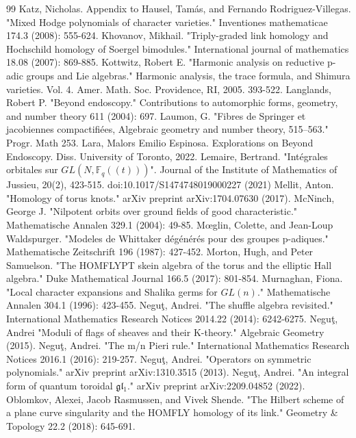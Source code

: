 \documentclass{amsart}
\numberwithin{equation}{section}
\theoremstyle{definition}
\newcommand{\fl}{\mathfrak{l}}
\newcommand{\fg}{\mathfrak{g}}
\begin{document}
\begin{thebibliography}{99}
 Katz, Nicholas. Appendix to Hausel, Tamás, and Fernando Rodriguez-Villegas. "Mixed Hodge polynomials of character varieties." Inventiones mathematicae 174.3 (2008): 555-624.
 Khovanov, Mikhail. "Triply-graded link homology and Hochschild homology of Soergel bimodules." International journal of mathematics 18.08 (2007): 869-885.
 Kottwitz, Robert E. "Harmonic analysis on reductive p-adic groups and Lie algebras." Harmonic analysis, the trace formula, and Shimura varieties. Vol. 4. Amer. Math. Soc. Providence, RI, 2005. 393-522.
 Langlands, Robert P. "Beyond endoscopy." Contributions to automorphic forms, geometry, and number theory 611 (2004): 697.
 Laumon, G. "Fibres de Springer et jacobiennes compactifiées, Algebraic geometry and number theory, 515–563." Progr. Math 253.
 Lara, Malors Emilio Espinosa. Explorations on Beyond Endoscopy. Diss. University of Toronto, 2022.
 Lemaire, Bertrand. "Int\'egrales orbitales sur $GL(N,\mathbb{F}_{q}((t)))$". Journal of the Institute of Mathematics of Jussieu, 20(2), 423-515. doi:10.1017/S1474748019000227 (2021)
 Mellit, Anton. "Homology of torus knots." arXiv preprint arXiv:1704.07630 (2017).
 McNinch, George J. "Nilpotent orbits over ground fields of good characteristic." Mathematische Annalen 329.1 (2004): 49-85.
 Mœglin, Colette, and Jean-Loup Waldspurger. "Modeles de Whittaker d\'eg\'en\'er\'es pour des groupes p-adiques." Mathematische Zeitschrift 196 (1987): 427-452.
 Morton, Hugh, and Peter Samuelson. "The HOMFLYPT skein algebra of the torus and the elliptic Hall algebra." Duke Mathematical Journal 166.5 (2017): 801-854.
 Murnaghan, Fiona. "Local character expansions and Shalika germs for $GL(n)$." Mathematische Annalen 304.1 (1996): 423-455.
 Neguţ, Andrei. "The shuffle algebra revisited." International Mathematics Research Notices 2014.22 (2014): 6242-6275.
 Neguţ, Andrei "Moduli of flags of sheaves and their K-theory." Algebraic Geometry (2015).
 Neguţ, Andrei. "The m/n Pieri rule." International Mathematics Research Notices 2016.1 (2016): 219-257.
 Neguţ, Andrei. "Operators on symmetric polynomials." arXiv preprint arXiv:1310.3515 (2013).
 Neguţ, Andrei. "An integral form of quantum toroidal $\fg\fl_1$." arXiv preprint arXiv:2209.04852  (2022).
 Oblomkov, Alexei, Jacob Rasmussen, and Vivek Shende. "The Hilbert scheme of a plane curve singularity and the HOMFLY homology of its link." Geometry \& Topology 22.2 (2018): 645-691.

\end{thebibliography}
\end{document}
